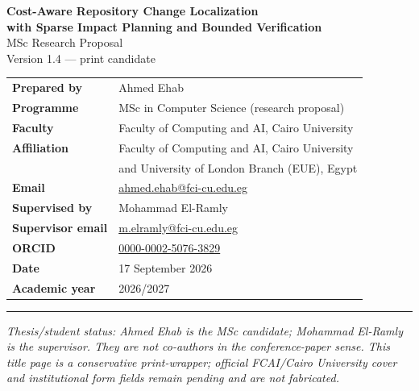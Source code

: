 \documentclass[11pt,a4paper]{article}
\begin{document}
\begin{center}
\vspace*{1.5cm}
{\LARGE\bfseries Cost-Aware Repository Change Localization\\[4pt]
with Sparse Impact Planning and Bounded Verification}\\[0.6cm]

{\large MSc Research Proposal}\\[0.4cm]
{\normalsize Version 1.4 — print candidate}\\[1.2cm]

\begin{tabular}{@{}ll@{}}
\textbf{Prepared by} & Ahmed Ehab \\
\textbf{Programme} & MSc in Computer Science (research proposal) \\
\textbf{Faculty} & Faculty of Computing and AI, Cairo University \\
\textbf{Affiliation} & Faculty of Computing and AI, Cairo University \\
                    & and University of London Branch (EUE), Egypt \\
\textbf{Email} & \href{mailto:ahmed.ehab@fci-cu.edu.eg}{ahmed.ehab@fci-cu.edu.eg} \\
\textbf{Supervised by} & Mohammad El-Ramly \\
\textbf{Supervisor email} & \href{mailto:m.elramly@fci-cu.edu.eg}{m.elramly@fci-cu.edu.eg} \\
\textbf{ORCID} & \href{https://orcid.org/0000-0002-5076-3829}{0000-0002-5076-3829} \\
\textbf{Date} & 17 September 2026 \\
\textbf{Academic year} & 2026/2027 \\
\end{tabular}

\vspace*{1.0cm}

\rule{\textwidth}{0.4pt}

\vspace*{0.5cm}
{\small\itshape
Thesis/student status: Ahmed Ehab is the MSc candidate; Mohammad El-Ramly is
the supervisor. They are not co-authors in the conference-paper sense. This
title page is a conservative print-wrapper; official FCAI/Cairo University
cover and institutional form fields remain pending and are not fabricated.
}

\end{center}
\end{document}
